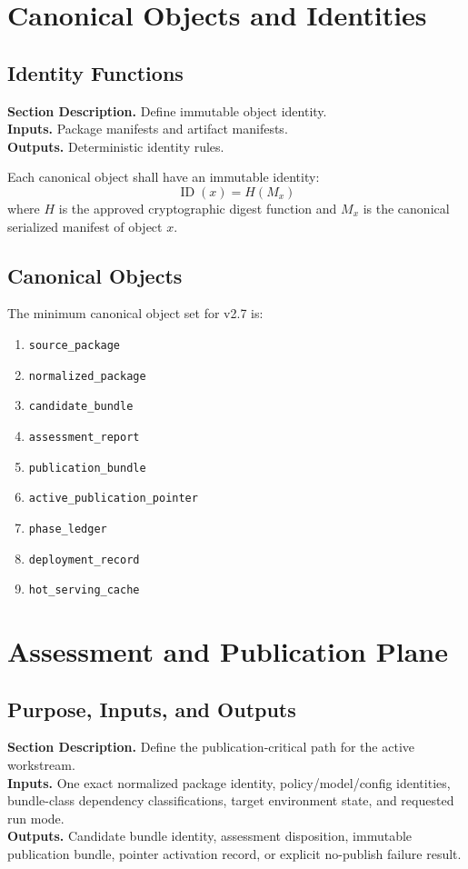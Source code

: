 \documentclass[11pt]{report}
\newcommand{\meta}[3]{\textbf{Section Description.} #1\\
\textbf{Inputs.} #2\\
\textbf{Outputs.} #3\par}
\begin{document}
\chapter{Canonical Objects and Identities}
\section{Identity Functions}
\meta{Define immutable object identity.}{Package manifests and artifact manifests.}{Deterministic identity rules.}

Each canonical object shall have an immutable identity:
\[
\operatorname{ID}(x) = H(M_x)
\]
where \(H\) is the approved cryptographic digest function and \(M_x\) is the canonical serialized manifest of object \(x\).

\section{Canonical Objects}
The minimum canonical object set for v2.7 is:
\begin{enumerate}[leftmargin=1.2cm]
    \item \texttt{source\_package}
    \item \texttt{normalized\_package}
    \item \texttt{candidate\_bundle}
    \item \texttt{assessment\_report}
    \item \texttt{publication\_bundle}
    \item \texttt{active\_publication\_pointer}
    \item \texttt{phase\_ledger}
    \item \texttt{deployment\_record}
    \item \texttt{hot\_serving\_cache}
\end{enumerate}

\chapter{Assessment and Publication Plane}
\section{Purpose, Inputs, and Outputs}
\meta{Define the publication-critical path for the active workstream.}{One exact normalized package identity, policy/model/config identities, bundle-class dependency classifications, target environment state, and requested run mode.}{Candidate bundle identity, assessment disposition, immutable publication bundle, pointer activation record, or explicit no-publish failure result.}
\end{document}
